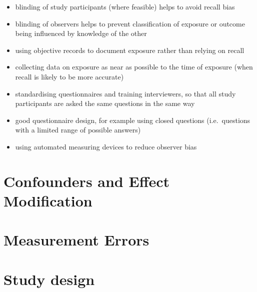 \documentclass[
  letterpaper,
  DIV=11,
  numbers=noendperiod]{scrreprt}
\begin{document}
\begin{itemize}
\item
  blinding of study participants (where feasible) helps to avoid recall
  bias
\item
  blinding of observers helps to prevent classification of exposure or
  outcome being influenced by knowledge of the other
\item
  using objective records to document exposure rather than relying on
  recall
\item
  collecting data on exposure as near as possible to the time of
  exposure (when recall is likely to be more accurate)
\item
  standardising questionnaires and training interviewers, so that all
  study participants are asked the same questions in the same way
\item
  good questionnaire design, for example using closed questions
  (i.e.~questions with a limited range of possible answers)
\item
  using automated measuring devices to reduce observer bias
\end{itemize}

\hypertarget{confounders-and-effect-modification}{%
\chapter{Confounders and Effect
Modification}\label{confounders-and-effect-modification}}

\hypertarget{measurement-errors}{%
\chapter{Measurement Errors}\label{measurement-errors}}

\hypertarget{study-design}{%
\chapter{Study design}\label{study-design}}
\end{document}
